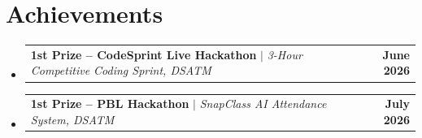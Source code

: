 \documentclass[letterpaper,10pt]{article}
\makeatletter
\newcommand{\resumeProjectHeading}[2]{
    \item
    \begin{tabular*}{1.001\textwidth}{l@{\extracolsep{\fill}}r}
      \small#1 & \textbf{\small #2}\\
    \end{tabular*}\vspace{-7pt}
}
\newcommand{\resumeSubHeadingListStart}{\begin{itemize}[leftmargin=0.0in, label={}]}
\newcommand{\resumeSubHeadingListEnd}{\end{itemize}}
\makeatother
\begin{document}
\section{Achievements}
    \vspace{-5pt}
    \resumeSubHeadingListStart
      \resumeProjectHeading{\textbf{1st Prize -- CodeSprint Live Hackathon} $|$ \emph{3-Hour Competitive Coding Sprint, DSATM}}{June 2026}
      \vspace{-20pt}
      \resumeProjectHeading{\textbf{1st Prize -- PBL Hackathon} $|$ \emph{SnapClass AI Attendance System, DSATM}}{July 2026}
      \vspace{-12pt}
    \resumeSubHeadingListEnd
\end{document}
